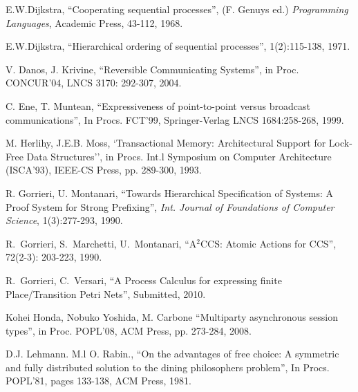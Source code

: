 \documentclass[submission,copyright,creativecommons]{eptcs}
\begin{document}
\begin{thebibliography}{10}
E.W.Dijkstra, ``Cooperating sequential processes'', 
\newblock (F. Genuys ed.) {\em Programming Languages}, Academic Press, 43-112, 1968.

E.W.Dijkstra, ``Hierarchical ordering of sequential processes'', 
 1(2):115-138, 1971.

V. Danos, J. Krivine,
\newblock  ``Reversible Communicating Systems'',
\newblock in Proc. CONCUR'04, LNCS 3170: 292-307, 2004.

C. Ene, T. Muntean,
\newblock  ``Expressiveness of point-to-point versus broadcast communications'',
\newblock In Procs. FCT'99, Springer-Verlag LNCS 1684:258-268, 1999.

M. Herlihy, J.E.B. Moss,
\newblock `Transactional Memory: Architectural Support for Lock-Free Data Structures'', 
\newblock in Procs. Int.l Symposium on Computer Architecture (ISCA'93),
IEEE-CS Press, pp. 289-300, 1993.


R. Gorrieri, U. Montanari, ``Towards Hierarchical Specification of Systems:
A Proof System for Strong Prefixing'',
{\em Int. Journal of Foundations of Computer Science},
1(3):277-293, 1990.

R.~Gorrieri, S.~Marchetti, U.~Montanari,
\newblock ``A$^2$CCS: Atomic Actions for CCS'',
 72(2-3): 203-223, 1990.

R.~Gorrieri, C.~Versari,
\newblock ``A Process Calculus for expressing finite Place/Transition Petri Nets'',
\newblock Submitted, 2010.


Kohei Honda, Nobuko Yoshida, M. Carbone
\newblock  ``Multiparty asynchronous session types'', 
\newblock in Proc. POPL'08, ACM Press, pp. 273-284, 2008.

D.J. Lehmann. M.l O. Rabin.,
\newblock ``On the advantages of free choice: 
A symmetric and fully distributed solution to the dining philosophers problem'',
\newblock In Procs. POPL'81, pages 133-138,  ACM Press, 1981. 


\end{thebibliography}
\end{document}

